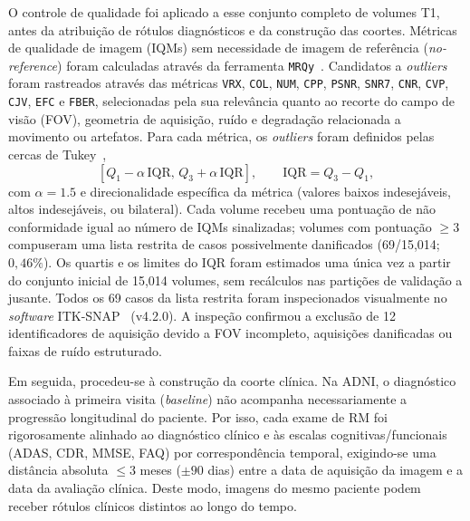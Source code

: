 \documentclass[review]{elsarticle}
\newcommand{\code}[1]{\texttt{#1}}
\begin{document}
	O controle de qualidade foi aplicado a esse conjunto completo de volumes T1, antes da atribuição de rótulos diagnósticos e da construção das coortes. Métricas de qualidade de imagem (IQMs) sem necessidade de imagem de referência (\emph{no-reference}) foram calculadas através da ferramenta \code{MRQy}~\citep{sadri-2020}. Candidatos a \textit{outliers} foram rastreados através das métricas \code{VRX}, \code{COL}, \code{NUM}, \code{CPP}, \code{PSNR}, \code{SNR7}, \code{CNR}, \code{CVP}, \code{CJV}, \code{EFC} e \code{FBER}, selecionadas pela sua relevância quanto ao recorte do campo de visão (FOV), geometria de aquisição, ruído e degradação relacionada a movimento ou artefatos. Para cada métrica, os \textit{outliers} foram definidos pelas cercas de Tukey~\citep{tukey-1977},
	\begin{equation}
		\left[Q_1 - \alpha\,\mathrm{IQR},\, Q_3 + \alpha\,\mathrm{IQR}\right],
		\qquad \mathrm{IQR} = Q_3 - Q_1,
		\label{eq:tukey}
	\end{equation}	
	com $\alpha = 1.5$ e direcionalidade específica da métrica (valores baixos indesejáveis, altos indesejáveis, ou bilateral). Cada volume recebeu uma pontuação de não conformidade igual ao número de IQMs sinalizadas; volumes com pontuação $\geq 3$ compuseram uma lista restrita de casos possivelmente danificados (69/15{,}014; $0{,}46\%$). Os quartis e os limites do IQR foram estimados uma única vez a partir do conjunto inicial de 15{,}014 volumes, sem recálculos nas partições de validação a jusante. Todos os 69 casos da lista restrita foram inspecionados visualmente no \textit{software} ITK-SNAP~\citep{yushkevich-2006} (v4.2.0). A inspeção confirmou a exclusão de 12 identificadores de aquisição devido a FOV incompleto, aquisições danificadas ou faixas de ruído estruturado.
	
	Em seguida, procedeu-se à construção da coorte clínica. Na ADNI, o diagnóstico associado à primeira visita (\textit{baseline}) não acompanha necessariamente a progressão longitudinal do paciente. Por isso, cada exame de RM foi rigorosamente alinhado ao diagnóstico clínico e às escalas cognitivas/funcionais (ADAS, CDR, MMSE, FAQ) por correspondência temporal, exigindo-se uma distância absoluta $\leq 3$ meses ($\pm 90$ dias) entre a data de aquisição da imagem e a data da avaliação clínica. Deste modo, imagens do mesmo paciente podem receber rótulos clínicos distintos ao longo do tempo. 
	
\end{document}
